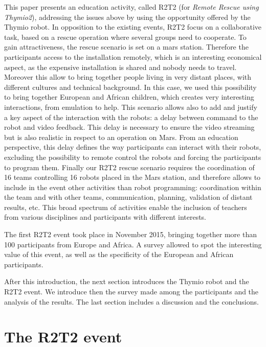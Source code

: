\documentclass{intech-journal}
\begin{document}
This paper presents an education activity, called R2T2 (for \textit{Remote Rescue using Thymio2}), addressing the issues above by using the opportunity offered by the Thymio robot. 
In opposition to the existing events, R2T2 focus on a collaborative task, based on a rescue operation where several groups need to cooperate.
To gain attractiveness, the rescue scenario is set on a mars station. 
Therefore the participants access to the installation remotely, which is an interesting economical aspect, as the expensive installation is shared and nobody needs to travel.
Moreover this allow to bring together people living in very distant places, with different cultures and technical background. In this case, we used this possibility to bring together European and African children, which creates very interesting interactions, from emulation to help.
This scenario allows also to add and justify a key aspect of the interaction with the robots: a delay between command to the robot and video feedback. 
This delay is necessary to ensure the video streaming but is also realistic in respect to an operation on Mars.
From an education perspective, this delay defines the way participants can interact with their robots, excluding the possibility to remote control the robots and forcing the participants to program them.
Finally our R2T2 rescue scenario requires the coordination of 16 teams controlling 16 robots placed in the Mars station, and therefore allows to include in the event other activities than robot programming: coordination within the team and with other teams, communication, planning, validation of distant results, etc.
This broad spectrum of activities enable the inclusion of teachers from various disciplines and participants with different interests.

The first R2T2 event took place in November 2015, bringing together more than 100 participants from Europe and Africa. 
A survey allowed to spot the interesting value of this event, as well as the specificity of the European and African participants.

After this introduction, the next section introduces the Thymio robot and the R2T2 event. 
We introduce then the survey made among the participants and the analysis of the results. 
The last section includes a discussion and the conclusions.


\section{The R2T2 event}
\end{document}
